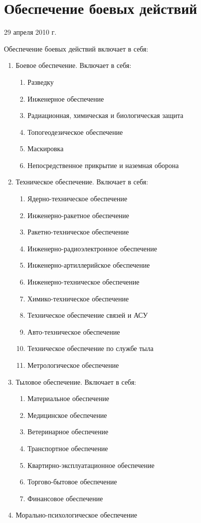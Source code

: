 \documentclass[a4paper,12pt]{article}
\begin{document}
	\section{\bf Обеспечение боевых действий}
	\centerline{29 апреля 2010 г.}
	Обеспечение боевых действий включает в себя:
	\begin{enumerate}
		\item Боевое обеспечение. Включает в себя:
		\begin{enumerate}
			\item Разведку
			\item Инженерное обеспечение
			\item Радиационная, химическая и биологическая защита
			\item Топогеодезическое обеспечение
			\item Маскировка
			\item Непосредственное прикрытие и наземная оборона
		\end{enumerate}		
		\item Техническое обеспечение. Включает в себя:
		\begin{enumerate}
			\item Ядерно-техническое обеспечение
			\item Инженерно-ракетное обеспечение
			\item Ракетно-техническое обеспечение
			\item Инженерно-радиоэлектронное обеспечение
			\item Инженерно-артиллерийское обеспечение
			\item Инженерно-техническое обеспечение
			\item Химико-техническое обеспечение
			\item Техническое обеспечение связей и АСУ
			\item Авто-техническое обеспечение
			\item Техническое обеспечение по службе тыла
			\item Метрологическое обеспечение
		\end{enumerate}
		\item Тыловое обеспечение. Включает в себя:
		\begin{enumerate}
			\item Материальное обеспечение
			\item Медицинское обеспечение
			\item Ветеринарное обеспечение
			\item Транспортное обеспечение
			\item Квартирно-эксплуатационное обеспечение
			\item Торгово-бытовое обеспечение
			\item Финансовое обеспечение
		\end{enumerate}
		\item Морально-психологическое обеспечение
	\end{enumerate}
	\newpage
\end{document}
